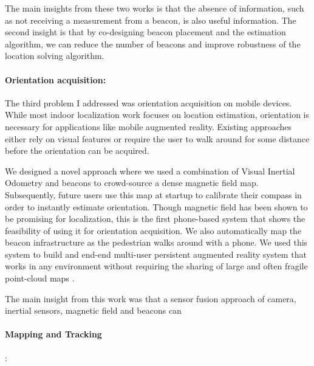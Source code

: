 \documentclass[10pt]{article}
\begin{document}

The main insights from these two works is that the absence of
information, such as not receiving a measurement from a beacon, is
also useful information. The second insight is that by co-designing
beacon placement and the estimation algorithm, we can reduce the
number of beacons and improve robustness of the location solving
algorithm.

\paragraph{Orientation acquisition:}

The third problem I addressed was orientation acquisition on mobile
devices. While most indoor localization work focuses on location
estimation, orientation is necessary for applications like mobile
augmented reality. Existing approaches either rely on visual features
or require the user to walk around for some distance before the
orientation can be acquired.


We designed a novel approach where we used a combination of Visual
Inertial Odometry and beacons to crowd-source a dense magnetic field
map. Subsequently, future users use this map at startup to calibrate
their compass in order to instantly estimate orientation. Though
magnetic field has been shown to be promising for localization, this
is the first phone-based system that shows the feasibility of using it
for orientation acquisition. We also automatically map the beacon
infrastructure as the pedestrian walks around with a phone.  We used
this system to build and end-end multi-user persistent augmented
reality system that works in any environment without requiring the
sharing of large and often fragile point-cloud maps
\cite{rajagopal2018welcome}.

The main insight from this work was that a sensor fusion approach of
camera, inertial sensors, magnetic field and beacons can

\paragraph{Mapping and Tracking}:
\end{document}
